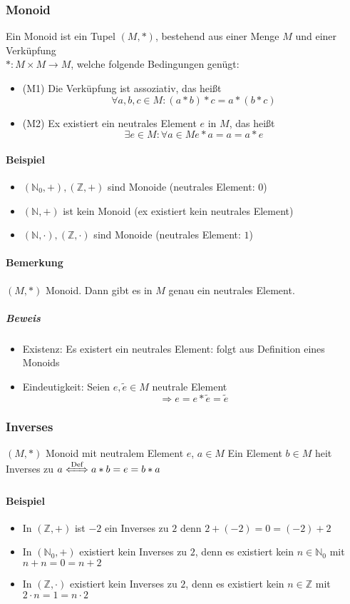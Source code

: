 \documentclass[a4paper]{scrartcl}
\DeclareMathOperator{\Forall}{\forall}
\begin{document}
\subsubsection{Monoid}
\label{sec-3-1-2}
Ein Monoid ist ein Tupel $(M,*)$, bestehend aus einer Menge $M$ und einer Verküpfung \\
    $*:M\times M \to M$, welche folgende Bedingungen genügt:
\begin{itemize}
\item (M1) Die Verküpfung ist assoziativ, das heißt \[\Forall a,b,c\in M:(a*b)*c = a*(b*c) \]
\item (M2) Ex existiert ein neutrales Element $e$ in $M$, das heißt \[\exists e\in M:\Forall a\in M e*a = a = a*e\]
\end{itemize}
\paragraph{Beispiel}
\label{sec-3-1-2-1}
\begin{itemize}
\item $(\mathbb{N}_0,+), (\mathbb{Z},+)$ sind Monoide (neutrales Element: $0$)
\item $(\mathbb{N},+)$ ist kein Monoid (ex existiert kein neutrales Element)
\item $(\mathbb{N},\cdot),(\mathbb{Z},\cdot)$ sind Monoide (neutrales Element: $1$)
\end{itemize}
\paragraph{Bemerkung}
\label{sec-3-1-2-2}
$(M,*)$ Monoid. Dann gibt es in $M$ genau ein neutrales Element.
\subparagraph{Beweis}
\label{sec-3-1-2-2-1}
\begin{itemize}
\item Existenz: Es existert ein neutrales Element: folgt aus Definition eines Monoids
\item Eindeutigkeit: Seien $e,\tilde e \in M$ neutrale Element \[\Rightarrow e = e * \tilde e = \tilde e\]
\end{itemize}
\subsubsection{Inverses}
\label{sec-3-1-3}
$(M,*)$ Monoid mit neutralem Element $e$, $a\in M$
Ein Element $b\in M$ heit Inverses zu $a \xLeftrightarrow{\text{Def}} a * b = e = b * a$
\paragraph{Beispiel}
\label{sec-3-1-3-1}
\begin{itemize}
\item In $(\mathbb{Z},+)$ ist $-2$ ein Inverses zu $2$ denn $2 + (-2) = 0 = (-2) + 2$
\item In $(\mathbb{N}_0,+)$ existiert kein Inverses zu $2$, denn es existiert kein $n\in \mathbb{N}_0$ mit $n + n = 0 = n + 2$
\item \label{invex} In $(\mathbb{Z},\cdot)$ existiert kein Inverses zu $2$, denn es existiert kein $n\in\mathbb{Z}$ mit $2\cdot n = 1 = n \cdot 2$
\end{itemize}
\end{document}
